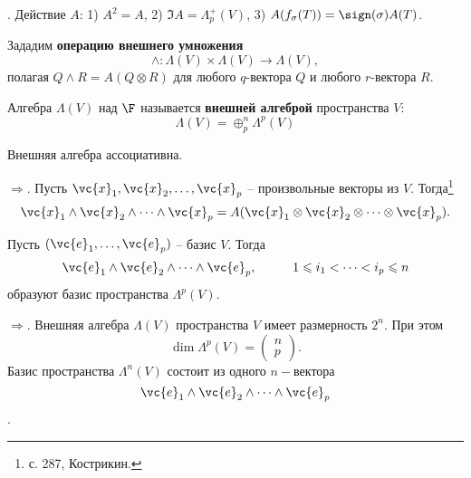 \noindent
\socrat. Действие $A$: 1) $A^2 = A$, 2) $\Im A = \Lambda^+_p (V)$, 3) $A(f_{\sigma}(T)) = \sign(\sigma) A(T)$.

\marginpar{\small $\wedge$}

\begin{to_def}
    Зададим \textbf{операцию внешнего умножения}
    \begin{equation}
        \wedge \colon \Lambda(V) \times \Lambda(V) \to \Lambda (V),
    \end{equation}
    полагая 
    $
        Q \wedge R = A(Q \otimes R)
    $
    для любого $q$-вектора $Q$ и любого $r$-вектора $R$. 
\end{to_def}

\begin{to_def}
    Алгебра $\Lambda (V)$ над $\F$ называется \textbf{внешней алгеброй} пространства $V$:
    \begin{equation}
        \Lambda(V) = \oplus_p^n \Lambda^p (V)
    \end{equation}
\end{to_def}

\begin{to_thr}
    Внешняя алгебра ассоциативна.
\end{to_thr}

\noindent
$\boxed{\Rightarrow}$. Пусть $\vc{x}_1, \vc{x}_2, \dots, \vc{x}_p$ -- произвольные векторы из $V$. Тогда\footnote{
    с. 287, Кострикин.
} 
\begin{equation}
    \vc{x}_1 \wedge \vc{x}_2 \wedge \dots \wedge \vc{x}_p = A(\vc{x}_1 \otimes \vc{x}_2 \otimes \dots \otimes \vc{x}_p).
\end{equation}

\begin{to_thr}
    Пусть $(\vc{e}_1, \dots, \vc{e}_p)$ -- базис $V$. Тогда 
    \begin{equation}
        \vc{e}_1 \wedge \vc{e}_2 \wedge \dots \wedge \vc{e}_p, \hspace{1cm} 1 \leqslant i_1 < \dots < i_p \leqslant n
    \end{equation}
    образуют базис пространства $\Lambda^p(V)$.
\end{to_thr}

\noindent
$\boxed{\Rightarrow}$. Внешняя алгебра $\Lambda(V)$ пространства $V$ имеет размерность $2^n$. При этом 
\begin{equation}
    \dim \Lambda^p (V) = \begin{pmatrix}
        n \\ p
    \end{pmatrix}.
\end{equation}
Базис пространства $\Lambda^n (V)$ состоит из одного $n-$вектора $$\vc{e}_1 \wedge \vc{e}_2 \wedge \dots \wedge \vc{e}_p$$.

